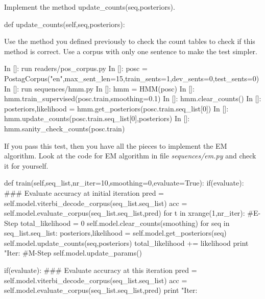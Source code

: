 \begin{exercise}

Implement the method update\_counts(seq,posteriors).
\begin{python}
 def update_counts(self,seq,posteriors):
\end{python}

Use the method you defined previously to check the count tables to
check if this method is correct. Use a corpus with only one sentence
to make the test simpler.

\begin{python}
In []: run readers/pos_corpus.py
In []: posc = PostagCorpus("en",max_sent_len=15,train_sents=1,dev_sents=0,test_sents=0)
In []: run sequences/hmm.py
In []: hmm = HMM(posc)
In []: hmm.train_supervised(posc.train,smoothing=0.1)
In []: hmm.clear_counts()
In []: posteriors,likelihood = hmm.get_posteriors(posc.train.seq_list[0])
In []: hmm.update_counts(posc.train.seq_list[0],posteriors)
In []: hmm.sanity_check_counts(posc.train)
\end{python}

If you pass this test, then you have all the pieces to implement the
EM algorithm. Look at the code for EM algorithm in file
\emph{sequences/em.py} and check it for yourself. 

\begin{python}
    def train(self,seq_list,nr_iter=10,smoothing=0,evaluate=True):
        if(evaluate):
            ### Evaluate accuracy at initial iteration
            pred = self.model.viterbi_decode_corpus(seq_list.seq_list)
            acc = self.model.evaluate_corpus(seq_list.seq_list,pred)
        for t in xrange(1,nr_iter):
            #E-Step
            total_likelihood = 0
            self.model.clear_counts(smoothing)
            for seq in seq_list.seq_list:
                posteriors,likelihood = self.model.get_posteriors(seq)
                self.model.update_counts(seq,posteriors)
                total_likelihood += likelihood
            print "Iter: %
            #M-Step
            self.model.update_params()

            if(evaluate):
                 ### Evaluate accuracy at this iteration
                pred = self.model.viterbi_decode_corpus(seq_list.seq_list)
                acc = self.model.evaluate_corpus(seq_list.seq_list,pred)
                print "Iter: %
\end{python}

\end{exercise}

